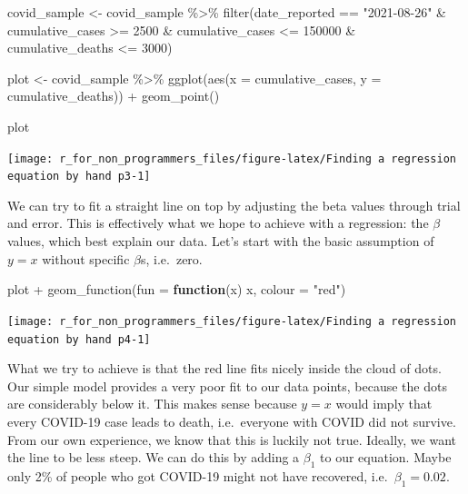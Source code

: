 \documentclass[
]{book}
\newenvironment{Shaded}{\begin{snugshade}}{\end{snugshade}}
\newcommand{\AttributeTok}[1]{\textcolor[rgb]{0.77,0.63,0.00}{#1}}
\newcommand{\ControlFlowTok}[1]{\textcolor[rgb]{0.13,0.29,0.53}{\textbf{#1}}}
\newcommand{\DecValTok}[1]{\textcolor[rgb]{0.00,0.00,0.81}{#1}}
\newcommand{\FunctionTok}[1]{\textcolor[rgb]{0.00,0.00,0.00}{#1}}
\newcommand{\NormalTok}[1]{#1}
\newcommand{\OtherTok}[1]{\textcolor[rgb]{0.56,0.35,0.01}{#1}}
\newcommand{\SpecialCharTok}[1]{\textcolor[rgb]{0.00,0.00,0.00}{#1}}
\newcommand{\StringTok}[1]{\textcolor[rgb]{0.31,0.60,0.02}{#1}}
\begin{document}
\begin{Shaded}
\begin{Highlighting}[]
\NormalTok{covid\_sample }\OtherTok{\textless{}{-}}\NormalTok{ covid\_sample }\SpecialCharTok{\%\textgreater{}\%}
  \FunctionTok{filter}\NormalTok{(date\_reported }\SpecialCharTok{==} \StringTok{"2021{-}08{-}26"} \SpecialCharTok{\&}
\NormalTok{           cumulative\_cases }\SpecialCharTok{\textgreater{}=} \DecValTok{2500} \SpecialCharTok{\&}
\NormalTok{           cumulative\_cases }\SpecialCharTok{\textless{}=} \DecValTok{150000} \SpecialCharTok{\&}
\NormalTok{           cumulative\_deaths }\SpecialCharTok{\textless{}=} \DecValTok{3000}\NormalTok{)}

\NormalTok{plot }\OtherTok{\textless{}{-}}\NormalTok{ covid\_sample }\SpecialCharTok{\%\textgreater{}\%}
  \FunctionTok{ggplot}\NormalTok{(}\FunctionTok{aes}\NormalTok{(}\AttributeTok{x =}\NormalTok{ cumulative\_cases,}
             \AttributeTok{y =}\NormalTok{ cumulative\_deaths)) }\SpecialCharTok{+}
  \FunctionTok{geom\_point}\NormalTok{()}

\NormalTok{plot}
\end{Highlighting}
\end{Shaded}

\begin{center}\texttt{[image: r\_for\_non\_programmers\_files/figure-latex/Finding a regression equation by hand p3-1]} \end{center}

We can try to fit a straight line on top by adjusting the beta values through trial and error. This is effectively what we hope to achieve with a regression: the \(\beta\) values, which best explain our data. Let's start with the basic assumption of \(y = x\) without specific \(\beta\)s, i.e.~zero.

\begin{Shaded}
\begin{Highlighting}[]
\NormalTok{plot }\SpecialCharTok{+}
  \FunctionTok{geom\_function}\NormalTok{(}\AttributeTok{fun =} \ControlFlowTok{function}\NormalTok{(x) x, }\AttributeTok{colour =} \StringTok{"red"}\NormalTok{)}
\end{Highlighting}
\end{Shaded}

\begin{center}\texttt{[image: r\_for\_non\_programmers\_files/figure-latex/Finding a regression equation by hand p4-1]} \end{center}

What we try to achieve is that the red line fits nicely inside the cloud of dots. Our simple model provides a very poor fit to our data points, because the dots are considerably below it. This makes sense because \(y = x\) would imply that every COVID-19 case leads to death, i.e.~everyone with COVID did not survive. From our own experience, we know that this is luckily not true. Ideally, we want the line to be less steep. We can do this by adding a \(\beta_1\) to our equation. Maybe only 2\% of people who got COVID-19 might not have recovered, i.e.~\(\beta_1 = 0.02\).
\end{document}
